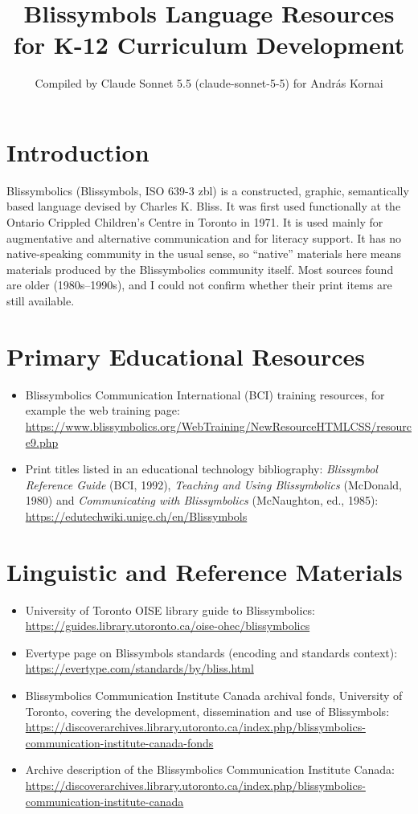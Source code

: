 \documentclass[12pt]{article}
\title{Blissymbols Language Resources for K-12 Curriculum Development}
\author{Compiled by Claude Sonnet 5.5 (claude-sonnet-5-5) for Andr\'as Kornai}
\date{}
\begin{document}
\maketitle

\section{Introduction}
Blissymbolics (Blissymbols, ISO 639-3 zbl) is a constructed, graphic, semantically based language devised by Charles K. Bliss. It was first used functionally at the Ontario Crippled Children's Centre in Toronto in 1971. It is used mainly for augmentative and alternative communication and for literacy support. It has no native-speaking community in the usual sense, so ``native'' materials here means materials produced by the Blissymbolics community itself. Most sources found are older (1980s--1990s), and I could not confirm whether their print items are still available.

\section{Primary Educational Resources}
\begin{itemize}
\item Blissymbolics Communication International (BCI) training resources, for example the web training page: \url{https://www.blissymbolics.org/WebTraining/NewResourceHTMLCSS/resource9.php}
\item Print titles listed in an educational technology bibliography: \emph{Blissymbol Reference Guide} (BCI, 1992), \emph{Teaching and Using Blissymbolics} (McDonald, 1980) and \emph{Communicating with Blissymbolics} (McNaughton, ed., 1985): \url{https://edutechwiki.unige.ch/en/Blissymbols}
\end{itemize}

\section{Linguistic and Reference Materials}
\begin{itemize}
\item University of Toronto OISE library guide to Blissymbolics: \url{https://guides.library.utoronto.ca/oise-ohec/blissymbolics}
\item Evertype page on Blissymbols standards (encoding and standards context): \url{https://evertype.com/standards/by/bliss.html}
\item Blissymbolics Communication Institute Canada archival fonds, University of Toronto, covering the development, dissemination and use of Blissymbols: \url{https://discoverarchives.library.utoronto.ca/index.php/blissymbolics-communication-institute-canada-fonds}
\item Archive description of the Blissymbolics Communication Institute Canada: \url{https://discoverarchives.library.utoronto.ca/index.php/blissymbolics-communication-institute-canada}
\end{itemize}
\end{document}
